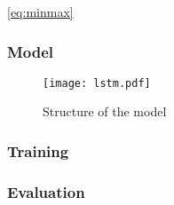 

\autoref{eq:minmax}

\subsubsection{Model}
\begin{figure}[ht]
    \centering
    \texttt{[image: lstm.pdf]}
    \caption{Structure of the model}
    \label{fig:lstm}
\end{figure}

\subsubsection{Training}

\subsubsection{Evaluation}
